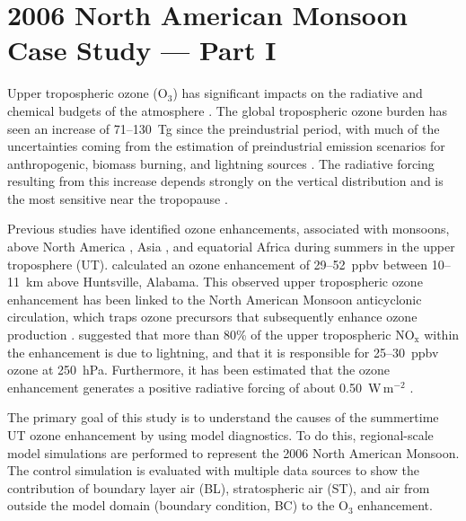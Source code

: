 \chapter{2006 North American Monsoon Case Study --- Part I} \label{ch:2006}

\ifpdf
    \graphicspath{{Chapter_2006/figures/PNG/}{Chapter_2006/figures/PDF/}{Chapter_2006/}}
\else
    \graphicspath{{Chapter_2006/figures/EPS/}{Chapter_2006/}}
\fi

Upper tropospheric ozone (O$_3$) has significant impacts on the radiative and chemical budgets of
the atmosphere \citep{Kiehl:1999uq}. The global tropospheric ozone burden has seen an
increase of 71--130~Tg since the preindustrial period, with much of the uncertainties
coming from the estimation of preindustrial emission scenarios for anthropogenic, biomass
burning, and lightning sources \citep[][and references therein]{Lamarque:2005gb}. The
radiative forcing resulting from this increase depends strongly on the vertical distribution and
is the most sensitive near the tropopause \citep{Lacis:1990fk}.

Previous studies have identified ozone enhancements, associated with monsoons, above North America
\citep[][and references therein]{Li:2005ss,Cooper:2009nx}, Asia \citep{Park:2007bh,Worden:2009ve},
and equatorial Africa \citep{Bouarar:2011ly} during summers in the upper troposphere (UT).
\citet{Cooper:2007cr} calculated an ozone enhancement of 29--52~ppbv between 10--11~km
above Huntsville, Alabama. This observed upper tropospheric ozone enhancement has
been linked to the North American Monsoon anticyclonic circulation, which traps ozone
precursors that subsequently enhance ozone production \citep{Li:2005ss}. \citet{Cooper:2009nx}
suggested that more than 80\% of the upper tropospheric NO$_\mathrm{x}$ within the enhancement
is due to lightning, and that it is responsible for 25--30~ppbv ozone at 250~hPa. Furthermore,
it has been estimated that the ozone enhancement generates a positive radiative forcing of about
0.50~W\,m$^{-2}$ \citep{Cooper:2007cr,Choi:2009bh}.

The primary goal of this study is to understand the causes of the summertime UT ozone enhancement by
using model diagnostics. To do this, regional-scale model simulations are performed to represent
the 2006 North American Monsoon. The control simulation is evaluated with multiple data sources to
show the contribution of boundary layer air (BL), stratospheric air (ST), and air from outside the model
domain (boundary condition, BC) to the O$_3$ enhancement.

